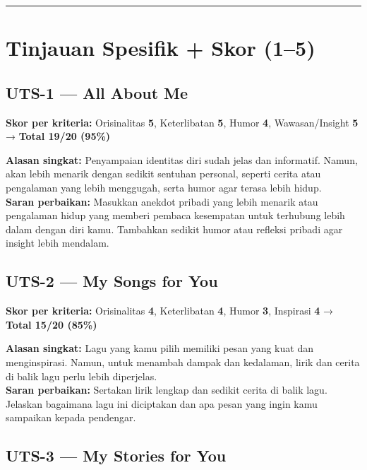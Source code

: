 \documentclass[
  letterpaper,
  DIV=11,
  numbers=noendperiod]{scrreprt}
\begin{document}
\begin{center}\rule{0.5\linewidth}{0.5pt}\end{center}

\section{Tinjauan Spesifik + Skor
(1--5)}\label{tinjauan-spesifik-skor-15}

\subsection{UTS-1 --- All About Me}\label{uts-1-all-about-me-1}

\textbf{Skor per kriteria:} Orisinalitas \textbf{5}, Keterlibatan
\textbf{5}, Humor \textbf{4}, Wawasan/Insight \textbf{5} → \textbf{Total
19/20 (95\%)}

\textbf{Alasan singkat:} Penyampaian identitas diri sudah jelas dan
informatif. Namun, akan lebih menarik dengan sedikit sentuhan personal,
seperti cerita atau pengalaman yang lebih menggugah, serta humor agar
terasa lebih hidup.\\
\textbf{Saran perbaikan:} Masukkan anekdot pribadi yang lebih menarik
atau pengalaman hidup yang memberi pembaca kesempatan untuk terhubung
lebih dalam dengan diri kamu. Tambahkan sedikit humor atau refleksi
pribadi agar insight lebih mendalam.

\subsection{UTS-2 --- My Songs for You}\label{uts-2-my-songs-for-you-1}

\textbf{Skor per kriteria:} Orisinalitas \textbf{4}, Keterlibatan
\textbf{4}, Humor \textbf{3}, Inspirasi \textbf{4} → \textbf{Total 15/20
(85\%)}

\textbf{Alasan singkat:} Lagu yang kamu pilih memiliki pesan yang kuat
dan menginspirasi. Namun, untuk menambah dampak dan kedalaman, lirik dan
cerita di balik lagu perlu lebih diperjelas.\\
\textbf{Saran perbaikan:} Sertakan lirik lengkap dan sedikit cerita di
balik lagu. Jelaskan bagaimana lagu ini diciptakan dan apa pesan yang
ingin kamu sampaikan kepada pendengar.

\subsection{UTS-3 --- My Stories for
You}\label{uts-3-my-stories-for-you-1}
\end{document}
